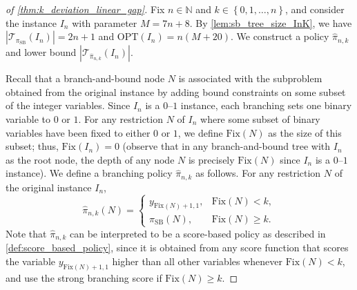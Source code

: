 \documentclass[smallextended,envcountsect]{svjour3} %
\newcommand{\N}{\mathbb{N}}
\newcommand{\set}[1]{\left\{#1\right\}}
\newcommand{\Tcal}{\mathcal{T}}
\newcommand{\0}{\mathbf{0}}
\newcommand{\1}{\mathbf{1}} %
\begin{document}
\begin{proof}[of \cref{thm:k_deviation_linear_gap}]
	Fix $n\in\N$ and $k\in\set{0,1,\dots,n}$, and consider the instance $I_n$ with parameter $M=7n+8$.
	By \cref{lem:sb_tree_size_InK}, we have $|\Tcal_{\pi_{\mathrm{SB}}}(I_n)|=2n+1$ and $\mathrm{OPT}(I_n)=n(M+20)$.
	We construct a policy $\hat\pi_{n,k}$ and lower bound $|\Tcal_{\hat\pi_{n,k}}(I_n)|$.

	Recall that a branch-and-bound node $N$ is associated with the subproblem obtained from the original instance by adding bound constraints on some subset of the integer variables.
	Since $I_n$ is a $0$--$1$ instance, each branching sets one binary variable to $0$ or $1$. For any restriction $N$ of $I_n$ where some subset of binary variables have been fixed to either $0$ or $1$, we define $\mathrm{Fix}(N)$ as the size of this subset; thus, $\mathrm{Fix}(I_n) = 0$ (observe that in any branch-and-bound tree with $I_n$ as the root node, the depth of any node $N$ is precisely $\mathrm{Fix}(N)$ since $I_n$ is a $0$--$1$ instance).
    We define a branching policy $\hat\pi_{n,k}$ as follows. For any restriction $N$ of the original instance $I_n$,
    \[
		\hat\pi_{n,k}(N)=
		\begin{cases}
			y_{\mathrm{Fix}(N)+1,1}, & \mathrm{Fix}(N)<k,\\
			\pi_{\mathrm{SB}}(N), & \mathrm{Fix}(N)\ge k.
		\end{cases}
	\]
    Note that $\hat\pi_{n,k}$ can be interpreted to be a score-based policy as described in \cref{def:score_based_policy}, since it is obtained from any score function that scores the variable $y_{\mathrm{Fix}(N)+1,1}$ higher than all other variables whenever $\mathrm{Fix}(N)<k$, and use the strong branching score if $\mathrm{Fix}(N)\geq k$.
    


\end{proof}
\end{document}
